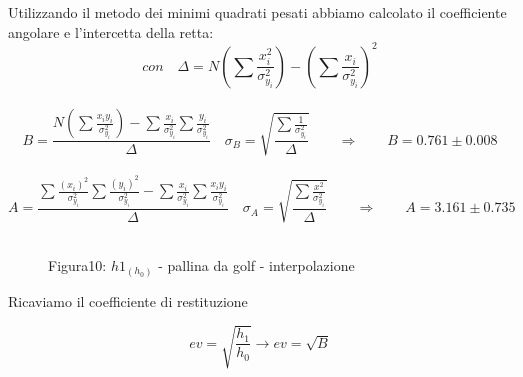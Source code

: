 \documentclass[a4paper]{article}
\theoremstyle{definition}
\begin{document}
	\noindent Utilizzando il metodo dei minimi quadrati pesati abbiamo calcolato il coefficiente angolare e l'intercetta della retta:\\
	\[ con\quad\Delta = N(\sum \frac{x_{i}^{2}}{\sigma _{y_{i}}^{2}})-(\sum \frac{x_{i}}{\sigma _{y_{i}}^{2}})^{2}\]\\
	\[B = \frac{N(\sum\frac{x_{i}y_{i}}{\sigma _{y_{i}}^{2}})-\sum\frac{x_{i}}{\sigma _{y_{i}}^{2}}\sum\frac{y_{i}}{\sigma _{y_{i}}^{2}}}{\Delta } \quad
	\sigma _{B} = \sqrt{\frac{\sum \frac{1}{\sigma _{y_{i}}^{2}}}{\Delta}} \qquad
	\Rightarrow \qquad B = 0.761 \pm 0.008\]\\
	\[A = \frac{\sum \frac{(x_{i})^{2}}{\sigma _{y_{i}}^{2}}\sum \frac{(y_{i})^{2}}{\sigma _{y_{i}}^{2}}-\sum \frac{x_{i}}{\sigma _{y_{i}}^{2}}\sum \frac{x_{i}y_{i}}{\sigma _{y_{i}}^{2}}}{\Delta} \quad  \sigma _{A} = \sqrt{\frac{\sum \frac{x^{2}}{\sigma _{y_{i}}^{2}}}{\Delta}} \qquad \Rightarrow \qquad A = 3.161 \pm 0.735\]\\
	
	\begin{figure}[!ht]
			\captionsetup{labelformat=empty}
	\caption{Figura10: \(h1_{(h_{0})}\) - pallina da golf - interpolazione}
	\end{figure}
	
	\noindent Ricaviamo il coefficiente di restituzione
	
	\[ev = \sqrt{\frac{h_{1}}{h_{0}}} \rightarrow ev = \sqrt{B}\]
	
\end{document}
